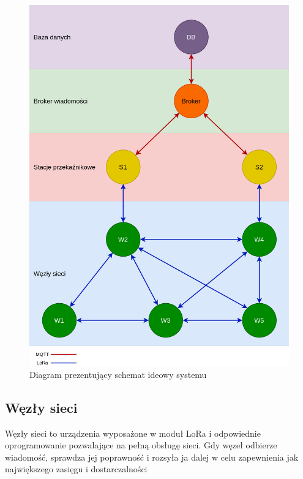 \begin{figure}[p!]
    \begin{center}
        \includegraphics[width=15cm]{pic/diagram-systemu.png}
    \end{center}
    \caption{Diagram prezentujący schemat ideowy systemu}\label{rys:system-diagram}
\end{figure}

\subsection{Węzły sieci}
Węzły sieci to urządzenia wyposażone w moduł LoRa i odpowiednie oprogramowanie pozwalające na pełną obsługę sieci. Gdy węzeł odbierze wiadomość, sprawdza jej poprawność i rozsyła ja dalej w celu zapewnienia jak największego zasięgu i dostarczalności


